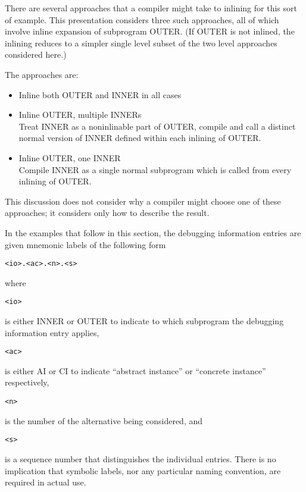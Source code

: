 There are several approaches that a compiler might take to
inlining for this sort of example. This presentation considers
three such approaches, all of which involve inline expansion
of subprogram OUTER. (If OUTER is not inlined, the inlining
reduces to a simpler single level subset of the two level
approaches considered here.)

The approaches are:

\begin{itemize}[1.]
\item  Inline both OUTER and INNER in all cases

\item Inline OUTER, multiple INNERs \\
Treat INNER as a non\dash inlinable part of OUTER, compile and
call a distinct normal version of INNER defined within each
inlining of OUTER.

\item Inline OUTER, one INNER \\
Compile INNER as a single normal subprogram which is called
from every inlining of OUTER.
\end{itemize}

This discussion does not consider why a compiler might choose
one of these approaches; it considers only how to describe
the result.

In the examples that follow in this section, the debugging
information entries are given mnemonic labels of the following
form

\begin{lstlisting}
<io>.<ac>.<n>.<s>
\end{lstlisting}

where \begin{verbatim}<io>\end{verbatim}
is either INNER or OUTER to indicate to which
subprogram the debugging information entry applies, 
\begin{verbatim}<ac>\end{verbatim}
is either AI or CI to indicate ``abstract instance'' or
``concrete instance'' respectively, 
\begin{verbatim}<n>\end{verbatim}
is the number of the
alternative being considered, and 
\begin{verbatim}<s>\end{verbatim}
is a sequence number that
distinguishes the individual entries. There is no implication
that symbolic labels, nor any particular naming convention,
are required in actual use.

